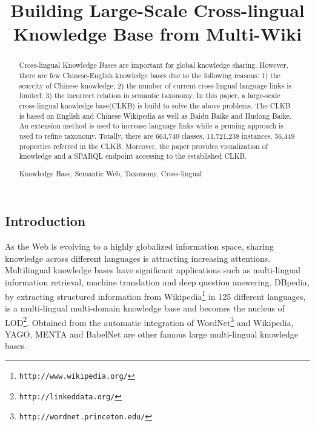\documentclass[runningheads,a4paper]{llncs}
\newcommand{\keywords}[1]{\par\addvspace\baselineskip\noindent\keywordname\enspace\ignorespaces#1}
\begin{document}
\begin{CJK*}{UTF8}{song}
\mainmatter

\title{Building Large-Scale Cross-lingual Knowledge Base from Multi-Wiki}


\maketitle

\begin{abstract}
Cross-lingual Knowledge Bases are important for global knowledge sharing. However, there are few Chinese-English knowledge bases due to the following reasons: 1) the scarcity of Chinese knowledge; 2) the number of current cross-lingual language links is limited; 3) the incorrect relation in semantic taxonomy. In this paper, a large-scale cross-lingual knowledge base(CLKB) is build to solve the above problems. The CLKB is based on English and Chinese Wikipedia as well as Baidu Baike and Hudong Baike. An extension method is used to increase language links while a pruning approach is used to refine taxonomy. Totally, there are 663,740 classes, 11,721,238 instances, 56,449 properties referred in the CLKB. Moreover, the paper provides visualization of knowledge and a SPARQL endpoint accessing to the established CLKB.

\keywords{Knowledge Base, Semantic Web, Taxonomy, Cross-lingual}
\end{abstract}

\section{Introduction}
As the Web is evolving to a highly globalized information space, sharing knowledge across different languages is attracting increasing attentions. Multilingual knowledge bases have significant applications such as multi-lingual information retrieval, machine translation and deep question answering. DBpedia, by extracting structured information from Wikipedia\footnote{{\tt http://www.wikipedia.org/}} in 125 different languages, is a multi-lingual multi-domain knowledge base and becomes the nucleus of LOD\footnote{{\tt http://linkeddata.org/}}. Obtained from the automatic integration of WordNet\footnote{{\tt http://wordnet.princeton.edu/}} and Wikipedia, YAGO, MENTA and BabelNet are other famous large multi-lingual knowledge bases.


\end{CJK*}
\end{document}
